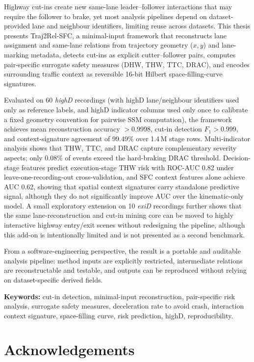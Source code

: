 \documentclass[12pt,a4paper,twoside,openright]{report}
\newcommand{\FrameworkName}{Traj2Rel-SFC}
\begin{document}
    Highway cut-ins create new same-lane leader--follower interactions that may require the follower to brake, yet most analysis pipelines depend on dataset-provided lane and neighbour identifiers, limiting reuse across datasets. This thesis presents \FrameworkName{}, a minimal-input framework that reconstructs lane assignment and same-lane relations from trajectory geometry ($x,y$) and lane-marking metadata, detects cut-ins as explicit cutter--follower pairs, computes pair-specific surrogate safety measures (DHW, THW, TTC, DRAC), and encodes surrounding traffic context as reversible 16-bit Hilbert space-filling-curve signatures.

    Evaluated on 60 \textit{highD} recordings (with highD lane/neighbour identifiers used only as reference labels, and highD indicator columns used only once to calibrate a fixed geometry convention for pairwise SSM computation), the framework achieves mean reconstruction accuracy $>$0.9998, cut-in detection $F_1 > 0.999$, and context-signature agreement of 99.49\% over 1.4\,M stage rows. Multi-indicator analysis shows that THW, TTC, and DRAC capture complementary severity aspects; only 0.08\% of events exceed the hard-braking DRAC threshold. Decision-stage features predict execution-stage THW risk with ROC-AUC 0.82 under leave-one-recording-out cross-validation, and SFC context features alone achieve AUC 0.62, showing that spatial context signatures carry standalone predictive signal, although they do not significantly improve AUC over the kinematic-only model. A small exploratory extension on 10 \textit{exiD} recordings further shows that the same lane-reconstruction and cut-in mining core can be moved to highly interactive highway entry/exit scenes without redesigning the pipeline, although this add-on is intentionally limited and is not presented as a second benchmark.

    From a software-engineering perspective, the result is a portable and auditable analysis pipeline: method inputs are explicitly restricted, intermediate relations are reconstructable and testable, and outputs can be reproduced without relying on dataset-specific derived fields.

    \noindent\textbf{Keywords:} cut-in detection, minimal-input reconstruction, pair-specific risk analysis, surrogate safety measures, deceleration rate to avoid crash, interaction context signature, space-filling curve, risk prediction, highD, reproducibility.

    \cleardoublepage
    \chapter*{Acknowledgements}
\end{document}
